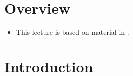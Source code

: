 \documentclass[11pt,twoside]{report}
\begin{document}



\section*{Overview} 

\begin{itemize}


\item This lecture is based on material in  \cite[Chapter~2]{chamberland:2023EF}.


\end{itemize}

\section{Introduction} 

\end{document}
